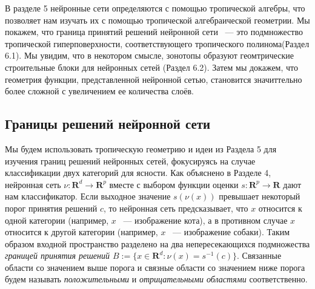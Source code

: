 \documentclass[russian]{lecture-notes}
\begin{document}
	В разделе 5 нейронные сети определяются с помощью тропической алгебры, что позволяет нам изучать их с помощью тропической алгебраической геометрии. Мы покажем, что граница принятий решений нейронной сети ~--- это подмножество тропической гиперповерхности, соответствующего тропического полинома(Раздел 6.1). Мы увидим, что в некотором смысле, зонотопы образуют геомтрические строительные блоки для нейронных сетей (Раздел 6.2). Затем мы докажем, что геометрия функции, представленной нейронной сетью, становится значиттельно более сложной с увеличением ее количества слоёв.
	\subsection{Границы решений нейронной сети}
	
	Мы будем использовать тропическую геометрию и идеи из Раздела 5 для изучения границ решений нейронных сетей, фокусируясь на случае классификации двух категорий для ясности. Как объяснено в Разделе 4, нейронная сеть $\nu : \mathbf{R}^d \rightarrow \mathbf{R}^p$ вместе с выбором функции оценки $s: \mathbf{R}^p \rightarrow \mathbf{R}$ дают нам классификатор. Если выходное значение $s(\nu(x))$ превышает некоторый порог принятия решений $c$, то нейронная сеть предсказывает, что $x$ относится к одной категории (например, $x$ ~--- изображение кота), а в противном случае $x$ относится к другой категории (например, $x$ ~--- изображение собаки). Таким образом входной пространство разделено на два непересекающихся подмножества \textit{границей принятия решений $B := \{x \in \mathbf{R}^d : \nu(x) = s^{-1}(c)\} $}. Связанные области со значением выше порога и связные области со значением ниже порога будем называть \textit{положительными} и \textit{отрицательными областями} соответственно.
	
\end{document}
